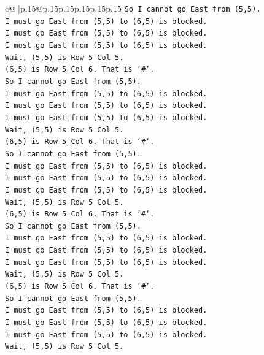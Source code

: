 \documentclass{article}
\begin{document}
{\begin{supertabular}{c@{$\;$}|p{.15\linewidth}@{}p{.15\linewidth}p{.15\linewidth}p{.15\linewidth}p{.15\linewidth}p{.15\linewidth}}
{{{\texttt{So I cannot go East from (5,5).} \\
\texttt{I must go East from (5,5) to (6,5) is blocked.} \\
\texttt{I must go East from (5,5) to (6,5) is blocked.} \\
\texttt{I must go East from (5,5) to (6,5) is blocked.} \\
\texttt{Wait, (5,5) is Row 5 Col 5.} \\
\texttt{(6,5) is Row 5 Col 6. That is `\#`.} \\
\texttt{So I cannot go East from (5,5).} \\
\texttt{I must go East from (5,5) to (6,5) is blocked.} \\
\texttt{I must go East from (5,5) to (6,5) is blocked.} \\
\texttt{I must go East from (5,5) to (6,5) is blocked.} \\
\texttt{Wait, (5,5) is Row 5 Col 5.} \\
\texttt{(6,5) is Row 5 Col 6. That is `\#`.} \\
\texttt{So I cannot go East from (5,5).} \\
\texttt{I must go East from (5,5) to (6,5) is blocked.} \\
\texttt{I must go East from (5,5) to (6,5) is blocked.} \\
\texttt{I must go East from (5,5) to (6,5) is blocked.} \\
\texttt{Wait, (5,5) is Row 5 Col 5.} \\
\texttt{(6,5) is Row 5 Col 6. That is `\#`.} \\
\texttt{So I cannot go East from (5,5).} \\
\texttt{I must go East from (5,5) to (6,5) is blocked.} \\
\texttt{I must go East from (5,5) to (6,5) is blocked.} \\
\texttt{I must go East from (5,5) to (6,5) is blocked.} \\
\texttt{Wait, (5,5) is Row 5 Col 5.} \\
\texttt{(6,5) is Row 5 Col 6. That is `\#`.} \\
\texttt{So I cannot go East from (5,5).} \\
\texttt{I must go East from (5,5) to (6,5) is blocked.} \\
\texttt{I must go East from (5,5) to (6,5) is blocked.} \\
\texttt{I must go East from (5,5) to (6,5) is blocked.} \\
\texttt{Wait, (5,5) is Row 5 Col 5.} \\
}}}
\end{supertabular}}
\end{document}
